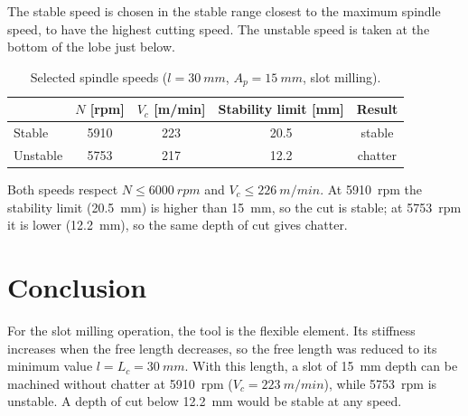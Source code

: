 \documentclass[11pt,a4paper]{article}
\begin{document}
The stable speed is chosen in the stable range closest to the maximum spindle speed, to
have the highest cutting speed. The unstable speed is taken at the bottom of the lobe just
below.

\begin{table}[H]
\centering
\caption{Selected spindle speeds ($l=\SI{30}{mm}$, $A_p=\SI{15}{mm}$, slot milling).}
\begin{tabular}{lcccc}
\toprule
 & $N$ [rpm] & $V_c$ [m/min] & Stability limit [mm] & Result \\
\midrule
Stable & 5910 & 223 & 20.5 & stable \\
Unstable & 5753 & 217 & 12.2 & chatter \\
\bottomrule
\end{tabular}
\end{table}

Both speeds respect $N\leq\SI{6000}{rpm}$ and $V_c\leq\SI{226}{m/min}$. At \SI{5910}{rpm}
the stability limit (\SI{20.5}{mm}) is higher than \SI{15}{mm}, so the cut is stable; at
\SI{5753}{rpm} it is lower (\SI{12.2}{mm}), so the same depth of cut gives chatter.

\section{Conclusion}
For the slot milling operation, the tool is the flexible element. Its stiffness increases
when the free length decreases, so the free length was reduced to its minimum value
$l=L_c=\SI{30}{mm}$. With this length, a slot of \SI{15}{mm} depth can be machined without
chatter at \SI{5910}{rpm} ($V_c=\SI{223}{m/min}$), while \SI{5753}{rpm} is unstable. A depth
of cut below \SI{12.2}{mm} would be stable at any speed.
\end{document}
